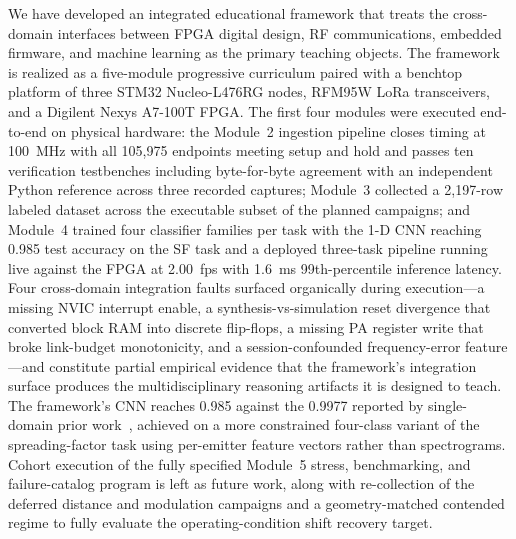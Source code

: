 \documentclass[conference]{IEEEtran}
\begin{document}
We have developed an integrated educational framework that treats the cross-domain interfaces between FPGA digital design, RF communications, embedded firmware, and machine learning as the primary teaching objects. The framework is realized as a five-module progressive curriculum paired with a benchtop platform of three STM32 Nucleo-L476RG nodes, RFM95W LoRa transceivers, and a Digilent Nexys A7-100T FPGA. The first four modules were executed end-to-end on physical hardware: the Module~2 ingestion pipeline closes timing at 100~MHz with all 105{,}975 endpoints meeting setup and hold and passes ten verification testbenches including byte-for-byte agreement with an independent Python reference across three recorded captures; Module~3 collected a 2{,}197-row labeled dataset across the executable subset of the planned campaigns; and Module~4 trained four classifier families per task with the 1-D CNN reaching 0.985 test accuracy on the SF task and a deployed three-task pipeline running live against the FPGA at 2.00~fps with 1.6~ms 99th-percentile inference latency. Four cross-domain integration faults surfaced organically during execution---a missing NVIC interrupt enable, a synthesis-vs-simulation reset divergence that converted block RAM into discrete flip-flops, a missing PA register write that broke link-budget monotonicity, and a session-confounded frequency-error feature---and constitute partial empirical evidence that the framework's integration surface produces the multidisciplinary reasoning artifacts it is designed to teach. The framework's CNN reaches 0.985 against the 0.9977 reported by single-domain prior work~\cite{b5}, achieved on a more constrained four-class variant of the spreading-factor task using per-emitter feature vectors rather than spectrograms. Cohort execution of the fully specified Module~5 stress, benchmarking, and failure-catalog program is left as future work, along with re-collection of the deferred distance and modulation campaigns and a geometry-matched contended regime to fully evaluate the operating-condition shift recovery target.
\end{document}
